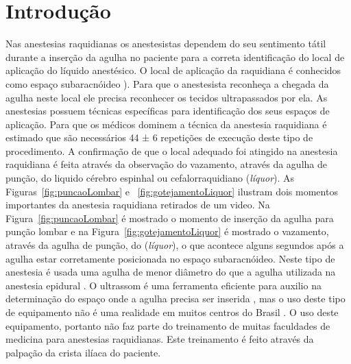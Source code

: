 



\chapter{Introdução}
\label{cap:introducao}

Nas anestesias raquidianas os anestesistas dependem do seu sentimento tátil durante a inserção da agulha no paciente para a correta identificação do local de aplicação do líquido anestésico. O local de aplicação da raquidiana é conhecidos como espaço subaracnóideo \cite{Miller2009}). Para que o anestesista reconheça a chegada da agulha neste local ele precisa reconhecer os tecidos ultrapassados por ela. As anestesias possuem técnicas específicas para identificação dos seus espaços de aplicação. Para que os médicos dominem a técnica da anestesia raquidiana é estimado que são necessários 44 ± 6 repetições de execução deste tipo de procedimento. A confirmação de que o local adequado foi atingido na anestesia raquidiana é feita através da observação do vazamento, através da agulha de punção, do liquido cérebro espinhal ou cefalorraquidiano (\textit{líquor}). As Figuras~\ref{fig:puncaoLombar} e ~\ref{fig:gotejamentoLiquor}  ilustram dois momentos importantes da anestesia raquidiana retirados de um video. Na Figura~\ref{fig:puncaoLombar} é mostrado o momento de inserção da agulha para punção lombar e na Figura~\ref{fig:gotejamentoLiquor} é mostrado o vazamento, através da agulha de punção, do (\textit{líquor}), o que acontece alguns segundos após a agulha estar corretamente posicionada no espaço subaracnóideo. Neste tipo de anestesia é usada uma agulha de menor diâmetro do que a agulha utilizada na anestesia epidural \cite{Miller2009}. O ultrassom é uma ferramenta eficiente para auxilio na determinação do espaço onde a agulha precisa ser inserida \cite{Helayel2010}, mas o uso deste tipo de equipamento não é uma realidade em muitos centros do Brasil \cite{Hamaji2016}. O uso deste equipamento, portanto não faz parte do treinamento de muitas faculdades de medicina para anestesias raquidianas. Este treinamento é feito através da palpação da crista ilíaca do paciente.

